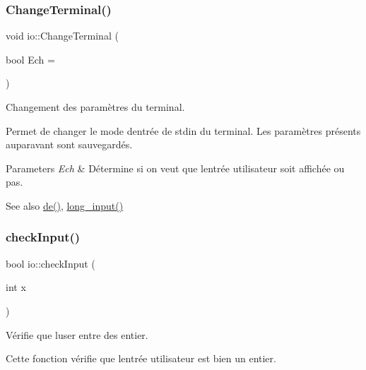 \subsubsection{\texorpdfstring{Change\+Terminal()}{ChangeTerminal()}}
{\footnotesize\ttfamily void io\+::\+Change\+Terminal (\begin{DoxyParamCaption}\item[{bool}]{Ech = {} }\end{DoxyParamCaption})}



Changement des paramètres du terminal. 

Permet de changer le mode d\textquotesingle{}entrée de stdin du terminal. Les paramètres présents auparavant sont sauvegardés. 
\begin{DoxyParams}{Parameters}
{\em Ech} & Détermine si on veut que l\textquotesingle{}entrée utilisateur soit affichée ou pas. \\
\hline
\end{DoxyParams}
\begin{DoxySeeAlso}{See also}
\hyperlink{namespaceio_ae9908b55f26f07e78043d7cfad003d22}{de()}, \hyperlink{namespaceio_ab044be3afd7ac04eeb1a496af0f1d5c6}{long\+\_\+input()} 
\end{DoxySeeAlso}
\mbox{\label{namespaceio_ac79ddb3191a9d00d007eb48deb315942}} 
\subsubsection{\texorpdfstring{check\+Input()}{checkInput()}}
{\footnotesize\ttfamily bool io\+::check\+Input (\begin{DoxyParamCaption}\item[{int}]{x }\end{DoxyParamCaption})}



Vérifie que l\textquotesingle{}user entre des entier. 

Cette fonction vérifie que l\textquotesingle{}entrée utilisateur est bien un entier.

